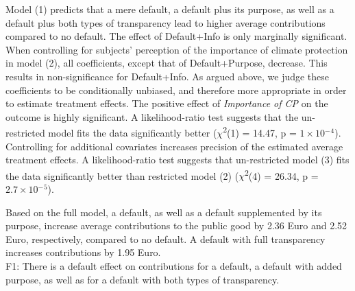 \documentclass[review, authoryear,12pt]{elsarticle}
\begin{document}
Model (1) predicts that a mere default, a default plus its purpose, as well as a default plus both types of transparency lead to higher average contributions compared to no default. The effect of Default+Info is only marginally significant. When controlling for subjects' perception of the importance of climate protection in model (2), all coefficients, except that of Default+Purpose, decrease. This results in non-significance for Default+Info. As argued above, we judge these coefficients to be conditionally unbiased, and therefore more appropriate in order to estimate treatment effects. The positive effect of \textit{Importance of CP} on the outcome is highly significant. A likelihood-ratio test suggests that the un-restricted model fits the data significantly better ($\chi$\textsuperscript{2}(1) = 14.47, p = $1\times 10$$^-$$^4$). Controlling for additional covariates increases precision of the estimated average treatment effects. A likelihood-ratio test suggests that un-restricted model (3) fits the data significantly better than restricted model (2) ($\chi$\textsuperscript{2}(4) = 26.34, p = $2.7\times 10$$^-$$^5$).

Based on the full model, a default, as well as a default supplemented by its purpose, increase average contributions to the public good by 2.36 Euro and 2.52 Euro, respectively, compared to no default. A default with full transparency increases contributions by 1.95 Euro. \\

F1: There is a default effect on contributions for a default, a default with added purpose, as well as for a default with both types of transparency. \\
\end{document}
